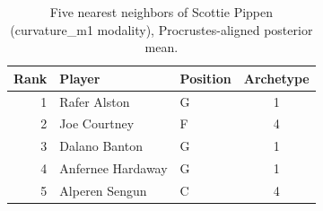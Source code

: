 \begin{table}[htbp]
  \centering\small
  \begin{tabular}{rllc}
    \toprule
    Rank & Player & Position & Archetype \\
    \midrule
    1 & Rafer Alston & G & 1 \\
    2 & Joe Courtney & F & 4 \\
    3 & Dalano Banton & G & 1 \\
    4 & Anfernee Hardaway & G & 1 \\
    5 & Alperen Sengun & C & 4 \\
    \bottomrule
  \end{tabular}
  \caption{Five nearest neighbors of Scottie Pippen (curvature_m1 modality), Procrustes-aligned posterior mean.}
  \label{tab:Scottie_Pippen_neighbors_curvature_m1}
\end{table}

